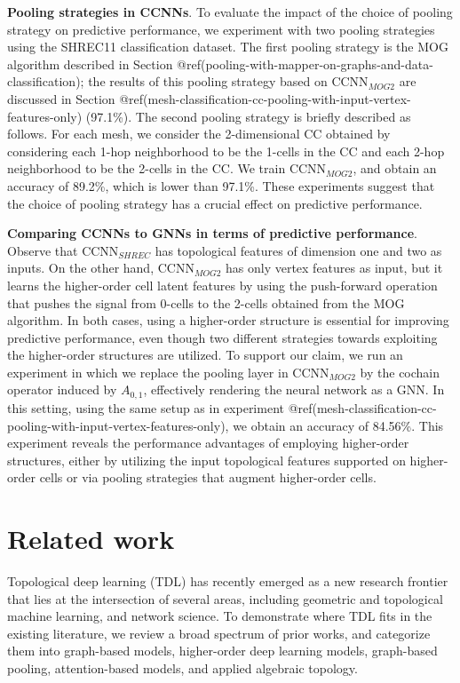 \documentclass[
  12pt,
]{krantz}
\begin{document}
\textbf{Pooling strategies in CCNNs}. To evaluate the impact of the
choice of pooling strategy on predictive performance, we experiment with
two pooling strategies using the SHREC11 classification dataset. The
first pooling strategy is the MOG algorithm described in Section
@ref(pooling-with-mapper-on-graphs-and-data-classification); the results
of this pooling strategy based on \(\mbox{CCNN}_{MOG2}\) are discussed
in Section
@ref(mesh-classification-cc-pooling-with-input-vertex-features-only)
(97.1\%). The second pooling strategy is briefly described as follows.
For each mesh, we consider the 2-dimensional CC obtained by considering
each 1-hop neighborhood to be the 1-cells in the CC and each 2-hop
neighborhood to be the 2-cells in the CC. We train
\(\mbox{CCNN}_{MOG2}\), and obtain an accuracy of 89.2\%, which is lower
than 97.1\%. These experiments suggest that the choice of pooling
strategy has a crucial effect on predictive performance.

\textbf{Comparing CCNNs to GNNs in terms of predictive performance}.
Observe that \(\mbox{CCNN}_{SHREC}\) has topological features of
dimension one and two as inputs. On the other hand,
\(\mbox{CCNN}_{MOG2}\) has only vertex features as input, but it learns
the higher-order cell latent features by using the push-forward
operation that pushes the signal from 0-cells to the 2-cells obtained
from the MOG algorithm. In both cases, using a higher-order structure is
essential for improving predictive performance, even though two
different strategies towards exploiting the higher-order structures are
utilized. To support our claim, we run an experiment in which we replace
the pooling layer in \(\mbox{CCNN}_{MOG2}\) by the cochain operator
induced by \(A_{0,1}\), effectively rendering the neural network as a
GNN. In this setting, using the same setup as in experiment
@ref(mesh-classification-cc-pooling-with-input-vertex-features-only), we
obtain an accuracy of 84.56\%. This experiment reveals the performance
advantages of employing higher-order structures, either by utilizing the
input topological features supported on higher-order cells or via
pooling strategies that augment higher-order cells.

\section{Related work}\label{related-work}

Topological deep learning (TDL) has recently emerged as a new research
frontier that lies at the intersection of several areas, including
geometric and topological machine learning, and network science. To
demonstrate where TDL fits in the existing literature, we review a broad
spectrum of prior works, and categorize them into graph-based models,
higher-order deep learning models, graph-based pooling, attention-based
models, and applied algebraic topology.
\end{document}
